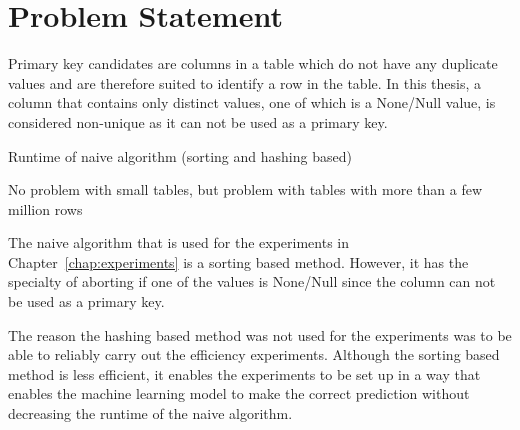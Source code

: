 \chapter{Problem Statement}\label{chap:problem_statement} %
Primary key candidates are columns in a table which do not have any duplicate values and are therefore suited to identify a row in the table. In this thesis, a column that contains only distinct values, one of which is a None/Null value, is considered non-unique as it can not be used as a primary key.  %

Runtime of naive algorithm (sorting and hashing based)

No problem with small tables, but problem with tables with more than a few million rows

The naive algorithm that is used for the experiments in Chapter~\ref{chap:experiments} is a sorting based method. However, it has the specialty of aborting if one of the values is None/Null since the column can not be used as a primary key.

The reason the hashing based method was not used for the experiments was to be able to reliably carry out the efficiency experiments. Although the sorting based method is less efficient, it enables the experiments to be set up in a way that enables the machine learning model to make the correct prediction without decreasing the runtime of the naive algorithm.
